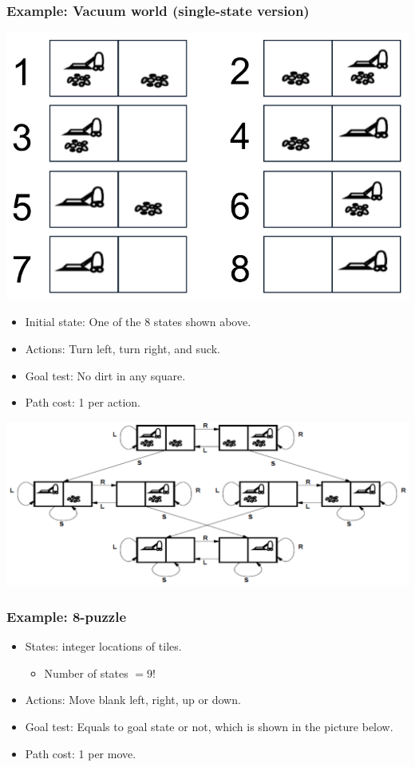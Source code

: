 \documentclass[11pt]{article}
\begin{document}
\subsubsection{Example: Vacuum world (single-state version)}
\label{sec:org0b7957c}
\begin{center}
\includegraphics[width=.9\linewidth]{./images/simple-vacuum-world-diagram.png}
\end{center}
\begin{itemize}
\item Initial state: One of the 8 states shown above.
\item Actions: Turn left, turn right, and suck.
\item Goal test: No dirt in any square.
\item Path cost: 1 per action.
\end{itemize}

\begin{center}
\includegraphics[width=.9\linewidth]{./images/simple-vacuum-world-map-of-possible-actions.png}
\end{center}

 \newpage
\subsubsection{Example: 8-puzzle}
\label{sec:org2332684}
\begin{itemize}
\item States: integer locations of tiles.
\begin{itemize}
\item Number of states \(= 9!\)
\end{itemize}
\item Actions: Move blank left, right, up or down.
\item Goal test: Equals to goal state or not, which is shown in the picture below.
\item Path cost: 1 per move.
\end{itemize}
\end{document}

